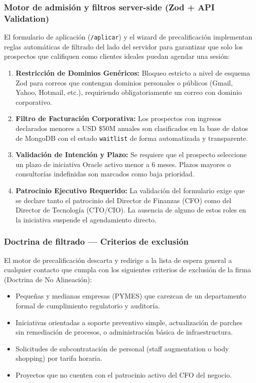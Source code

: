 \documentclass[11pt,letterpaper]{article}
\begin{document}
\subsubsection{Motor de admisión y filtros server-side (Zod + API Validation)}
El formulario de aplicación (\texttt{/aplicar}) y el wizard de precalificación implementan reglas automáticas de filtrado del lado del servidor para garantizar que solo los prospectos que califiquen como clientes ideales puedan agendar una sesión:
\begin{enumerate}
\item \textbf{Restricción de Dominios Genéricos:} Bloqueo estricto a nivel de esquema Zod para correos que contengan dominios personales o públicos (Gmail, Yahoo, Hotmail, etc.), requiriendo obligatoriamente un correo con dominio corporativo.
\item \textbf{Filtro de Facturación Corporativa:} Los prospectos con ingresos declarados menores a USD \$50M anuales son clasificados en la base de datos de MongoDB con el estado \texttt{waitlist} de forma automatizada y transparente.
\item \textbf{Validación de Intención y Plazo:} Se requiere que el prospecto seleccione un plazo de iniciativa Oracle activo menor a 6 meses. Plazos mayores o consultorías indefinidas son marcados como baja prioridad.
\item \textbf{Patrocinio Ejecutivo Requerido:} La validación del formulario exige que se declare tanto el patrocinio del Director de Finanzas (CFO) como del Director de Tecnología (CTO/CIO). La ausencia de alguno de estos roles en la iniciativa suspende el agendamiento directo.
\end{enumerate}

\subsubsection{Doctrina de filtrado — Criterios de exclusión}
El motor de precalificación descarta y redirige a la lista de espera general a cualquier contacto que cumpla con los siguientes criterios de exclusión de la firma (Doctrina de No Alineación):
\begin{itemize}
\item Pequeñas y medianas empresas (PYMES) que carezcan de un departamento formal de cumplimiento regulatorio y auditoría.
\item Iniciativas orientadas a soporte preventivo simple, actualización de parches sin remediación de procesos, o administración básica de infraestructura.
\item Solicitudes de subcontratación de personal (staff augmentation o body shopping) por tarifa horaria.
\item Proyectos que no cuenten con el patrocinio activo del CFO del negocio.
\end{itemize}
\end{document}
